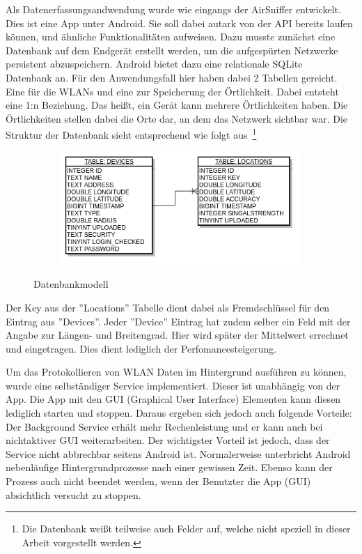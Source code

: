 \documentclass[11pt,a4paper]{article}
\begin{document}
Als Datenerfassungsandwendung wurde wie eingangs der AirSniffer entwickelt. Dies ist eine App unter Android. Sie soll dabei autark von der API bereits laufen können, und ähnliche Funktionalitäten aufweisen. Dazu musste zunächst eine Datenbank auf dem Endgerät erstellt werden, um die aufgespürten Netzwerke persistent abzuspeichern. Android bietet dazu eine relationale SQLite~\cite{sqlite} Datenbank an. Für den Anwendungsfall hier haben dabei 2 Tabellen gereicht. Eine für die WLANs und eine zur Speicherung der Örtlichkeit. Dabei entsteht eine 1:n Beziehung. Das heißt, ein Gerät kann mehrere Örtlichkeiten haben. Die Örtlichkeiten stellen dabei die Orte dar, an dem das Netzwerk sichtbar war. Die  Struktur der Datenbank sieht entsprechend wie folgt aus~\footnote{Die Datenbank weißt teilweise auch Felder auf, welche nicht speziell in dieser Arbeit vorgestellt werden.}

\begin{figure}[htbp]
    \centering
    \begin{subfigure}[b]{1\textwidth}
        \includegraphics[width=\textwidth]{pics/dbView.png}
    \end{subfigure}
    \caption{Datenbankmodell}\label{fig:DB_VIEW}
\end{figure}

Der Key aus der ''Locations'' Tabelle dient dabei als Fremdschlüssel für den Eintrag aus ''Devices''. Jeder ''Device'' Eintrag hat zudem selber ein Feld mit der Angabe zur Längen- und Breitengrad. Hier wird später der Mittelwert errechnet und eingetragen. Dies dient lediglich der Perfomancesteigerung. 

Um das Protokollieren von WLAN Daten im Hintergrund ausführen zu können, wurde eine selbständiger Service implementiert. Dieser ist unabhängig von der App. Die App mit den GUI (Graphical User Interface) Elementen kann diesen lediglich starten und stoppen. Daraus ergeben sich jedoch auch folgende Vorteile: Der Background Service erhält mehr Rechenleistung und er kann auch bei nichtaktiver GUI weiterarbeiten. Der wichtigster Vorteil ist jedoch, dass der Service nicht abbrechbar seitens Android ist. Normalerweise unterbricht Android nebenläufige Hintergrundprozesse nach einer gewissen Zeit. Ebenso kann der Prozess auch nicht beendet werden, wenn der Benutzter die App (GUI) absichtlich versucht zu stoppen. 
\end{document}
